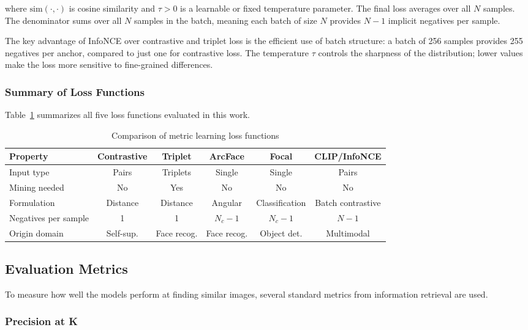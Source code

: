 \documentclass[
    english,
]{VUMIFPSbakalaurinis}
\begin{document}
where $\text{sim}(\cdot, \cdot)$ is cosine similarity and $\tau > 0$ is a learnable or fixed temperature parameter. The final loss averages over all $N$ samples. The denominator sums over all $N$ samples in the batch, meaning each batch of size $N$ provides $N-1$ implicit negatives per sample.

The key advantage of InfoNCE over contrastive and triplet loss is the efficient use of batch structure: a batch of 256 samples provides 255 negatives per anchor, compared to just one for contrastive loss. The temperature $\tau$ controls the sharpness of the distribution; lower values make the loss more sensitive to fine-grained differences.

\subsubsection{Summary of Loss Functions}

Table~\ref{tab:loss_comparison} summarizes all five loss functions evaluated in this work.

\begin{table}[H]
\centering
\caption{Comparison of metric learning loss functions}
\label{tab:loss_comparison}
\begin{tabular}{lccccc}
\toprule
\textbf{Property} & \textbf{Contrastive} & \textbf{Triplet} & \textbf{ArcFace} & \textbf{Focal} & \textbf{CLIP/InfoNCE} \\
\midrule
Input type & Pairs & Triplets & Single & Single & Pairs \\
Mining needed & No & Yes & No & No & No \\
Formulation & Distance & Distance & Angular & Classification & Batch contrastive \\
Negatives per sample & 1 & 1 & $N_c - 1$ & $N_c - 1$ & $N - 1$ \\
Origin domain & Self-sup. & Face recog. & Face recog. & Object det. & Multimodal \\
\bottomrule
\end{tabular}
\end{table}

\subsection{Evaluation Metrics}

To measure how well the models perform at finding similar images, several standard metrics from information retrieval are used.

\subsubsection{Precision at K}
\end{document}
